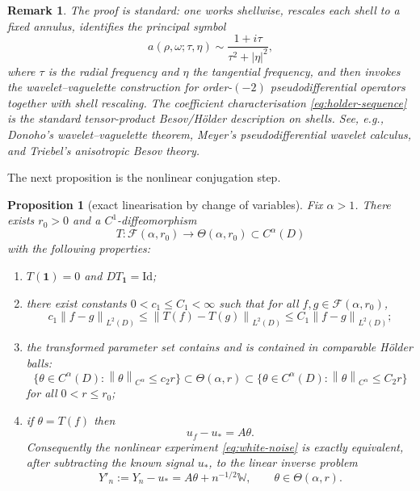\documentclass[11pt]{article}
\newtheorem{proposition}[theorem]{Proposition}
\newtheorem{remark}[theorem]{Remark}
\newcommand{\1}{\mathbf 1}
\newcommand{\norm}[1]{\left\|#1\right\|}
\begin{document}
\begin{remark}
The proof is standard: one works shellwise, rescales each shell to a fixed annulus, identifies the principal symbol
\[
a(\rho,\omega;\tau,\eta)\sim \frac{1+i\tau}{\tau^2+|\eta|^2},
\]
where $\tau$ is the radial frequency and $\eta$ the tangential frequency, and then invokes the wavelet--vaguelette construction for order-$(-2)$ pseudodifferential operators together with shell rescaling. The coefficient characterisation \eqref{eq:holder-sequence} is the standard tensor-product Besov/Hölder description on shells. See, e.g., Donoho's wavelet--vaguelette theorem, Meyer's pseudodifferential wavelet calculus, and Triebel's anisotropic Besov theory.
\end{remark}

The next proposition is the nonlinear conjugation step.

\begin{proposition}[exact linearisation by change of variables]\label{prop:exact-linearisation}
Fix $\alpha>1$. There exists $r_0>0$ and a $C^1$-diffeomorphism
\[
T:\mathcal F(\alpha,r_0)\to \Theta(\alpha,r_0)\subset C^\alpha(D)
\]
with the following properties:
\begin{enumerate}[label=(\roman*),leftmargin=2em]
\item $T(\1)=0$ and $DT_{\1}=\mathrm{Id}$;
\item there exist constants $0<c_1\le C_1<\infty$ such that for all $f,g\in\mathcal F(\alpha,r_0)$,
\begin{equation}\label{eq:T-bilip}
c_1\norm{f-g}_{L^2(D)}\le \norm{T(f)-T(g)}_{L^2(D)}\le C_1\norm{f-g}_{L^2(D)};
\end{equation}
\item the transformed parameter set contains and is contained in comparable Hölder balls:
\begin{equation}\label{eq:Theta-ball}
\{\theta\in C^\alpha(D):\norm{\theta}_{C^\alpha}\le c_2 r\}
\subset \Theta(\alpha,r)
\subset
\{\theta\in C^\alpha(D):\norm{\theta}_{C^\alpha}\le C_2 r\}
\end{equation}
for all $0<r\le r_0$;
\item if $\theta=T(f)$ then
\begin{equation}\label{eq:exact-conjugacy}
u_f-u_\ast=A\theta.
\end{equation}
Consequently the nonlinear experiment \eqref{eq:white-noise} is exactly equivalent, after subtracting the known signal $u_\ast$, to the linear inverse problem
\begin{equation}\label{eq:linear-transformed}
Y'_n:=Y_n-u_\ast=A\theta+n^{-1/2}\mathbb W,
\qquad
\theta\in\Theta(\alpha,r).
\end{equation}
\end{enumerate}
\end{proposition}
\end{document}

